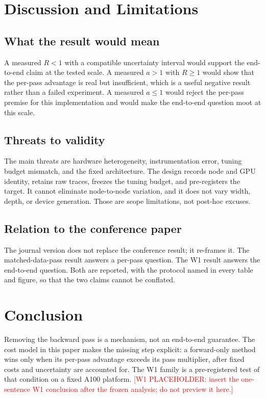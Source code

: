 \documentclass[preprint,12pt]{elsarticle}
\newcommand{\wone}[1]{\textcolor{red}{[W1 PLACEHOLDER: #1]}}
\begin{document}
\section{Discussion and Limitations}
\label{sec:discussion}

\subsection{What the result would mean}
A measured $R<1$ with a compatible uncertainty interval would support the
end-to-end claim at the tested scale.  A measured $a>1$ with $R\ge1$ would show
that the per-pass advantage is real but insufficient, which is a useful
negative result rather than a failed experiment.  A measured $a\le1$ would
reject the per-pass premise for this implementation and would make the
end-to-end question moot at this scale.

\subsection{Threats to validity}
The main threats are hardware heterogeneity, instrumentation error, tuning
budget mismatch, and the fixed architecture.  The design records node and GPU
identity, retains raw traces, freezes the tuning budget, and pre-registers the
target.  It cannot eliminate node-to-node variation, and it does not vary
width, depth, or device generation.  Those are scope limitations, not
post-hoc excuses.

\subsection{Relation to the conference paper}
The journal version does not replace the conference result; it re-frames it.
The matched-data-pass result answers a per-pass question.  The W1 result
answers the end-to-end question.  Both are reported, with the protocol named
in every table and figure, so that the two claims cannot be conflated.

\section{Conclusion}
\label{sec:conclusion}

Removing the backward pass is a mechanism, not an end-to-end guarantee.  The
cost model in this paper makes the missing step explicit: a forward-only method
wins only when its per-pass advantage exceeds its pass multiplier, after fixed
costs and uncertainty are accounted for.  The W1 family is a pre-registered
test of that condition on a fixed A100 platform.  \wone{insert the one-sentence
W1 conclusion after the frozen analysis; do not preview it here.}
\end{document}
